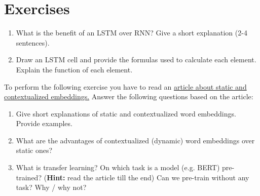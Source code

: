 
\def\pathToRoot{../../}


\def\issolution{}




\section*{Exercises}

\begin{exercise}[Architecture][0.5 + 1.5 = 2]

\begin{enumerate}
	\item What is the benefit of an LSTM over RNN? Give a short explanation (2-4 sentences).
	\item Draw an LSTM cell and provide the formulas used to calculate each element. Explain
the function of each element.  
\end{enumerate}

\end{exercise}


\begin{solution}

\end{solution}

\begin{exercise}[Embeddings] [1 + 0.5 + 0.5 = 2]

    To perform the following exercise you have to read an \href{https://towardsdatascience.com/from-pre-trained-word-embeddings-to-pre-trained-language-models-focus-on-bert-343815627598}{article about static and contextualized embeddings.} Answer the following questions based on the article:

    \begin{enumerate}
        \item Give short explanations of static and contextualized word embeddings. Provide examples.
        \item What are the advantages of contextualized (dynamic) word embeddings over static ones?
        \item What is transfer learning? On which task is a model (e.g. BERT) pre-trained? (\textbf{Hint:} read the article till the end) Can we pre-train without any task? Why / why not?
    \end{enumerate}
        
\end{exercise}

